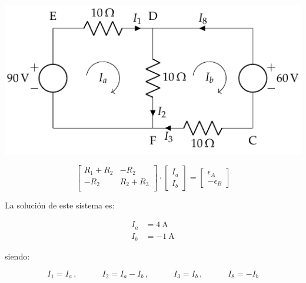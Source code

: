 \documentclass[10pt]{article}
\begin{document}
\vspace{3mm}
\begin{minipage}{0.5\linewidth}
    \begin{center}
      \includegraphics{figs/BT1_10_izq_mallas.pdf}
    \end{center}
\end{minipage}
\hfill
\begin{minipage}{0.4\linewidth}
    \begin{equation*}
      \begin{bmatrix}
        R_1 + R_2 & -R_2\\
        -R_2 & R_2 + R_3\\
      \end{bmatrix} \cdot %
      \begin{bmatrix}
        I_a\\
        I_b
      \end{bmatrix} = %
      \begin{bmatrix}
        \epsilon_A\\
        -\epsilon_B
      \end{bmatrix}
    \end{equation*} 
\end{minipage}






\vspace{4mm}
La solución de este sistema es:

\vspace{-5mm}
\begin{align*}
  I_a &= \qty{4}{\ampere}\\
  I_b &= \qty{-1}{\ampere}
\end{align*}

siendo:

\vspace{-5mm}
\begin{equation*}
  I_1 = I_a \, , \qquad\quad
  I_2 = I_a - I_b \, , \qquad\quad
  I_3 = I_b \, , \qquad\quad
  I_8 = -I_b
\end{equation*}
\end{document}

